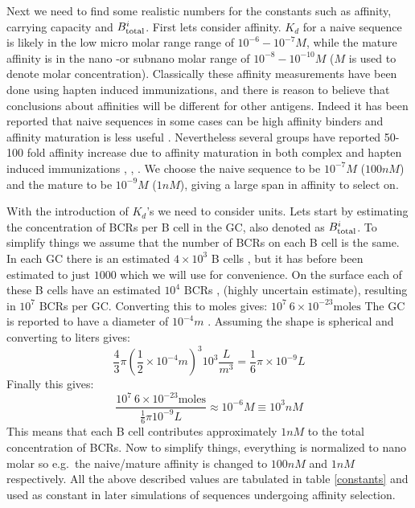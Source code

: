 Next we need to find some realistic numbers for the constants such as affinity, carrying capacity and $B^i_{\text{total}}$.
First lets consider affinity.
$K_d$ for a naive sequence is likely in the low micro molar range range of $10^{-6} - 10^{-7} M$, while the mature affinity is in the nano -or subnano molar range of $10^{-8} - 10^{-10} M$ \cite{berek1987mutation} ($M$ is used to denote molar concentration).
Classically these affinity measurements have been done using hapten induced immunizations, and there is reason to believe that conclusions about affinities will be different for other antigens.
Indeed it has been reported that naive sequences in some cases can be high affinity binders and affinity maturation is less useful \cite{frank2015simple}.
Nevertheless several groups have reported 50-100 fold affinity increase due to affinity maturation in both complex and hapten induced immunizations \cite{Kelsoe_2016}, \cite{phan2006high}, \cite{ulrich1997interplay}.
We choose the naive sequence to be $10^{-7} M$ ($100nM$) and the mature to be $10^{-9} M$ ($1nM$), giving a large span in affinity to select on.

With the introduction of $K_d$'s we need to consider units.
Lets start by estimating the concentration of BCRs per B cell in the GC, also denoted as $B^i_{\text{total}}$.
To simplify things we assume that the number of BCRs on each B cell is the same.
In each GC there is an estimated $4 \times 10^3$ B cells \cite{kroese1990germinal}, but it has before been estimated to just $1000$ \cite{Childs_Baskerville_Cobey_2015} which we will use for convenience.
On the surface each of these B cells have an estimated $10^4$ BCRs \cite{rieckmann2017social}, \cite{immprot} (highly uncertain estimate), resulting in $10^7$ BCRs per GC.
Converting this to moles gives: $10^7\ 6 \times 10^{-23} \text{moles}$
The GC is reported to have a diameter of $10^{-4} m$ \cite{Romppanen_1981}.
Assuming the shape is spherical and converting to liters gives:
$$
\frac{4}{3} \pi \left(\frac{1}{2} \times 10^{-4} m \right)^3 10^3 \frac{L}{m^3} = \frac{1}{6} \pi \times 10^{-9} L
$$
Finally this gives:
$$\frac{10^7\ 6 \times 10^{-23} \text{moles}}{\frac{1}{6} \pi 10^{-9} L} \approx 10^{-6} M \equiv 10^{3} nM
$$
This means that each B cell contributes approximately $1nM$ to the total concentration of BCRs.
Now to simplify things, everything is normalized to nano molar so e.g.\ the naive/mature affinity is changed to $100nM$ and $1nM$ respectively.
All the above described values are tabulated in table \ref{constants} and used as constant in later simulations of sequences undergoing affinity selection.

